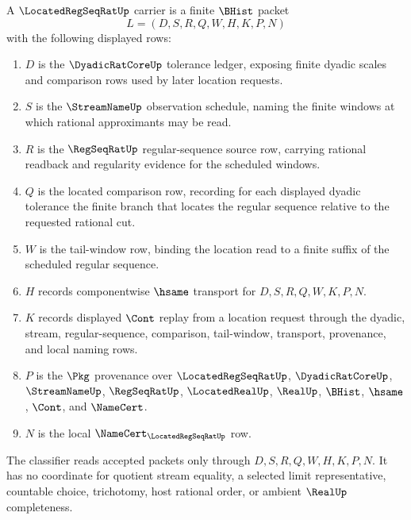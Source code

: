 \begin{definition}
\label{def:located-regseqrat-carrier}
A $\LocatedRegSeqRatUp$ carrier is a finite $\BHist$ packet
$$
L=(D,S,R,Q,W,H,K,P,N)
$$
with the following displayed rows:
\begin{enumerate}
\item $D$ is the $\DyadicRatCoreUp$ tolerance ledger, exposing finite dyadic scales and comparison rows used by later location requests.
\item $S$ is the $\StreamNameUp$ observation schedule, naming the finite windows at which rational approximants may be read.
\item $R$ is the $\RegSeqRatUp$ regular-sequence source row, carrying rational readback and regularity evidence for the scheduled windows.
\item $Q$ is the located comparison row, recording for each displayed dyadic tolerance the finite branch that locates the regular sequence relative to the requested rational cut.
\item $W$ is the tail-window row, binding the location read to a finite suffix of the scheduled regular sequence.
\item $H$ records componentwise $\hsame$ transport for $D,S,R,Q,W,K,P,N$.
\item $K$ records displayed $\Cont$ replay from a location request through the dyadic, stream, regular-sequence, comparison, tail-window, transport, provenance, and local naming rows.
\item $P$ is the $\Pkg$ provenance over $\LocatedRegSeqRatUp$, $\DyadicRatCoreUp$, $\StreamNameUp$, $\RegSeqRatUp$, $\LocatedRealUp$, $\RealUp$, $\BHist$, $\hsame$, $\Cont$, and $\NameCert$.
\item $N$ is the local $\NameCert_{\LocatedRegSeqRatUp}$ row.
\end{enumerate}
The classifier reads accepted packets only through $D,S,R,Q,W,H,K,P,N$. It has no coordinate for quotient stream equality, a selected limit representative, countable choice, trichotomy, host rational order, or ambient $\RealUp$ completeness.
\end{definition}

